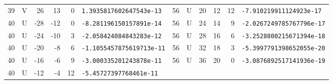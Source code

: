 \begin{longtable}{rcrrrl|rcrrrl}
39 & V & 26 & 13 & 0 & \texttt{1.3935817602647543e-13} & 56 & U & 20 & 12 & 12 & \texttt{-7.910219911124923e-17}\\
40 & U & -28 & -12 & 0 & \texttt{-8.281196150157891e-14} & 56 & U & 24 & 14 & 9 & \texttt{-2.0267249785767796e-17}\\
40 & U & -24 & -10 & 3 & \texttt{-2.058424084843283e-12} & 56 & U & 28 & 16 & 6 & \texttt{-3.2528800215671394e-18}\\
40 & U & -20 & -8 & 6 & \texttt{-1.1055457875619713e-11} & 56 & U & 32 & 18 & 3 & \texttt{-5.3997791398652055e-20}\\
40 & U & -16 & -6 & 9 & \texttt{-3.000335201243878e-11} & 56 & U & 36 & 20 & 0 & \texttt{-3.0876892517141936e-19}\\
40 & U & -12 & -4 & 12 & \texttt{-5.45727397768461e-11} &  & & & & & \\
\end{longtable}
